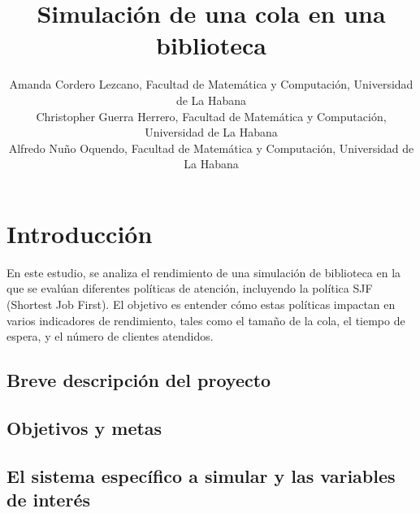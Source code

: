 \documentclass[10pt,twocolumn]{article}
\begin{document}
	\title{Simulación de una cola en una biblioteca}
	\author{
		Amanda Cordero Lezcano, Facultad de Matemática y Computación, Universidad de La Habana\\
		Christopher Guerra Herrero, Facultad de Matemática y Computación, Universidad de La Habana\\
		Alfredo Nuño Oquendo, Facultad de Matemática y Computación, Universidad de La Habana\\
	}
	
	
	
	\section{Introducción}
	En este estudio, se analiza el rendimiento de una simulación de biblioteca en la que se evalúan diferentes políticas de atención, incluyendo la política SJF (Shortest Job First). El objetivo es entender cómo estas políticas impactan en varios indicadores de rendimiento, tales como el tamaño de la cola, el tiempo de espera, y el número de clientes atendidos.
	\subsection{Breve descripción del proyecto}
	\subsection{Objetivos y metas}
	\subsection{El sistema específico a simular y las variables de interés}
\end{document}
